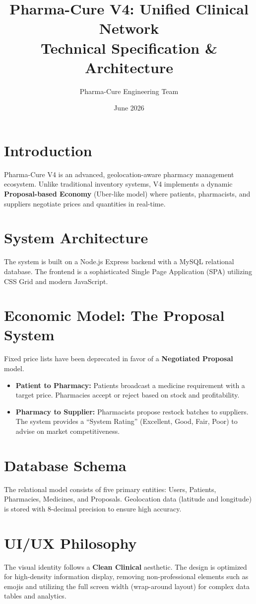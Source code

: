 \documentclass[12pt, a4paper]{article}
\title{Pharma-Cure V4: Unified Clinical Network \\ \large Technical Specification \& Architecture}
\author{Pharma-Cure Engineering Team}
\date{June 2026}
\begin{document}
\maketitle

\section{Introduction}
Pharma-Cure V4 is an advanced, geolocation-aware pharmacy management ecosystem. Unlike traditional inventory systems, V4 implements a dynamic \textbf{Proposal-based Economy} (Uber-like model) where patients, pharmacists, and suppliers negotiate prices and quantities in real-time.

\section{System Architecture}
The system is built on a Node.js Express backend with a MySQL relational database. The frontend is a sophisticated Single Page Application (SPA) utilizing CSS Grid and modern JavaScript.

\section{Economic Model: The Proposal System}
Fixed price lists have been deprecated in favor of a \textbf{Negotiated Proposal} model.
\begin{itemize}
    \item \textbf{Patient to Pharmacy:} Patients broadcast a medicine requirement with a target price. Pharmacies accept or reject based on stock and profitability.
    \item \textbf{Pharmacy to Supplier:} Pharmacists propose restock batches to suppliers. The system provides a ``System Rating'' (Excellent, Good, Fair, Poor) to advise on market competitiveness.
\end{itemize}

\section{Database Schema}
The relational model consists of five primary entities: Users, Patients, Pharmacies, Medicines, and Proposals. Geolocation data (latitude and longitude) is stored with 8-decimal precision to ensure high accuracy.

\section{UI/UX Philosophy}
The visual identity follows a \textbf{Clean Clinical} aesthetic. The design is optimized for high-density information display, removing non-professional elements such as emojis and utilizing the full screen width (wrap-around layout) for complex data tables and analytics.
\end{document}
